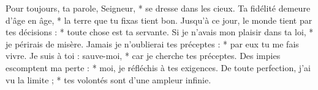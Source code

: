 Pour toujours, ta parole, Seigneur, *
se dresse dans les cieux.
\versseparator
Ta fidélité demeure d’âge en âge, *
la terre que tu fixas tient bon.
\versseparator
Jusqu’à ce jour, le monde tient par tes décisions : *
toute chose est ta servante.
\versseparator
Si je n’avais mon plaisir dans ta loi, *
je périrais de misère.
\versseparator
Jamais je n’oublierai tes préceptes : *
par eux tu me fais vivre.
\versseparator
Je suis à toi : sauve-moi, *
car je cherche tes préceptes.
\versseparator
Des impies escomptent ma perte : *
moi, je réfléchis à tes exigences.
\versseparator
De toute perfection, j’ai vu la limite ; *
tes volontés sont d’une ampleur infinie.
